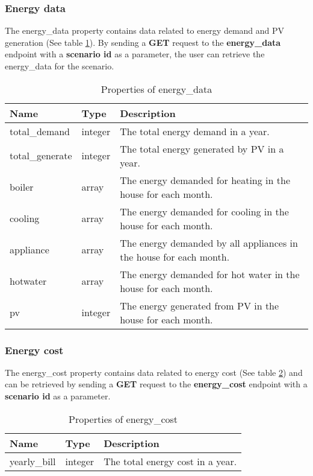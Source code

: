 \subsubsection{Energy data}

The energy\_data property contains data related to energy demand and PV generation (See table \ref{tab:properties_energydata}).  
By sending a \textbf{GET} request to the \textbf{energy\_data} endpoint with a \textbf{scenario id} as a parameter,
the user can retrieve the energy\_data for the scenario.

\begin{table}[h!]
    \centering
    \small
    \begin{tabular}{ | p{} | p{} | p{} | } 
    \hline
    Name & Type & Description\\
    \hline
    total\_demand & integer & The total energy demand in a year.\\
    \hline
    total\_generate & integer & The total energy generated by PV in a year.\\
    \hline
    boiler & array & The energy demanded for heating in the house for each month.\\
    \hline
    cooling & array & The energy demanded for cooling in the house for each month.\\
    \hline
    appliance & array & The energy demanded by all appliances in the house for each month.\\
    \hline
    hotwater & array & The energy demanded for hot water in the house for each month.\\
    \hline
    pv & integer & The energy generated from PV in the house for each month.\\
    \hline
    \end{tabular}
    \caption{Properties of energy\_data}
    \label{tab:properties_energydata}
\end{table}


\subsubsection{Energy cost}

The energy\_cost property contains data related to energy cost (See table \ref{tab:properties_energycost})
and can be retrieved by sending a \textbf{GET} request to the \textbf{energy\_cost} endpoint with a \textbf{scenario id} as a parameter.

\begin{table}[h!]
    \centering
    \small
    \begin{tabular}{ | p{} | p{} | p{} | } 
    \hline
    Name & Type & Description\\
    \hline
    yearly\_bill & integer & The total energy cost in a year.\\
    \hline
    \end{tabular}
    \caption{Properties of energy\_cost}
    \label{tab:properties_energycost}
\end{table}



